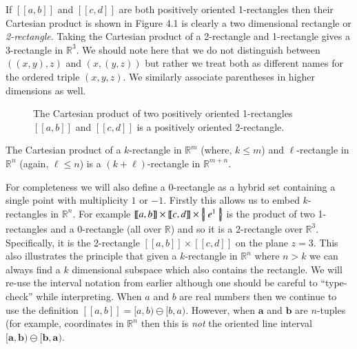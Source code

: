 If $[\![a,b]\!]$ and $[\![c,d]\!]$ are both positively oriented 1-rectangles then their Cartesian product is shown in Figure 4.1 is clearly a two dimensional rectangle or \emph{2-rectangle}. 
Taking the Cartesian product of a 2-rectangle and 1-rectangle gives a 3-rectangle in $\mathbb{R}^3$. 
We should note here that we do not distinguish between $((x,y),z)$ and $(x,(y,z))$ but rather we treat both as different names for the ordered triple $(x,y,z)$.
We similarly associate parentheses in higher dimensions as well.

\begin{figure}[ht]
\caption[Cartesian product of two 1-rectangles]{The Cartesian product of two positively oriented 1-rectangles $[\![a,b]\!]$ and $[\![c,d]\!]$ is a positively oriented 2-rectangle.}
\centering
{}
\end{figure}

\begin{theorem}
	The Cartesian product of a $k$-rectangle in $\mathbb{R}^m$ (where, $k\leq m$) 
	and $\ell$-rectangle in $\mathbb{R}^n$ (again, $\ell \leq n$) 
	is a $(k+\ell)$-rectangle in $\mathbb{R}^{m+n}$.
\end{theorem}

For completeness we will also define a 0-rectangle as a hybrid set containing a single point with multiplicity $1$ or $-1$.
Firstly this allows us to embed $k$-rectangles in $\mathbb{R}^n$.
For example $[\![a,b]\!] \times [\![c,d]\!] \times \left\{ \! \left| \; e^1 \; \right| \! \right\}$ is the product of two 1-rectangles and a 0-rectangle (all over $\mathbb{R}$) and so it is a 2-rectangle over $\mathbb{R}^3$.
Specifically, it is the 2-rectangle $[\![a,b]\!] \times [\![c,d]\!]$ on the plane $z=3$.
This also illustrates the principle that given a $k$-rectangle in $\mathbb{R}^n$ where $n>k$ we can always find a $k$ dimensional subspace which also contains the rectangle.
We will re-use the interval notation from earlier although one should be careful to ``type-check'' while interpreting.
When $a$ and $b$ are real numbers then we continue to use the definition $[\![a,b]\!] = [a,b) \ominus [b,a)$.
However, when $\boldsymbol{a}$ and $\boldsymbol{b}$ are $n$-tuples (for example, coordinates in $\mathbb{R}^n$ then this is \emph{not} the oriented line interval $[\boldsymbol{a}, \boldsymbol{b}) \ominus [\boldsymbol{b}, \boldsymbol{a})$.

